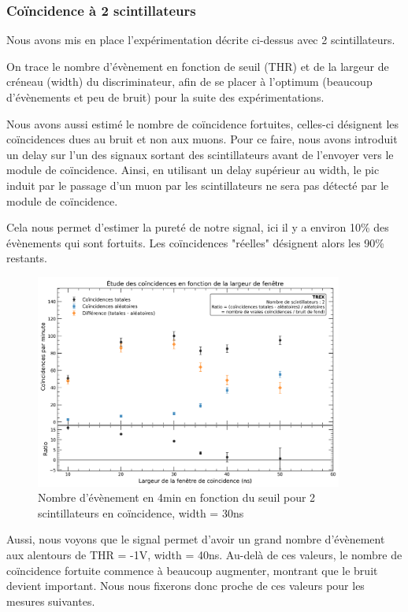 \documentclass[a4paper,12pt,twoside]{article}
\begin{document}
\subsubsection{Coïncidence à 2 scintillateurs}
Nous avons mis en place l’expérimentation décrite ci-dessus avec 2 scintillateurs.

On trace le nombre d’évènement en fonction de seuil (THR) et de la largeur de créneau (width) du discriminateur, afin de se placer à l’optimum (beaucoup d’évènements et peu de bruit) pour la suite des expérimentations.

Nous avons aussi estimé le nombre de coïncidence fortuites, celles-ci désignent les coïncidences dues au bruit et non aux muons. Pour ce faire, nous avons introduit un delay sur l’un des signaux sortant des scintillateurs avant de l’envoyer vers le module de coïncidence. Ainsi, en utilisant un delay supérieur au width, le pic induit par le passage d’un muon par les scintillateurs ne sera pas détecté par le module de coïncidence.

Cela nous permet d’estimer la pureté de notre signal, ici il y a environ 10\% des évènements qui sont fortuits. Les coïncidences "réelles" désignent alors les 90\% restants.

\begin{figure}[H]
    \centering
    \includegraphics[width=0.9\textwidth]{Images/Coincidences_2_Scintillateurs.png}
    \caption[Nombre d’évènement en 4min en fonction du seuil]{Nombre d’évènement en 4min en fonction du seuil pour 2 scintillateurs en coïncidence, width = 30ns}
\end{figure}

Aussi, nous voyons que le signal permet d’avoir un grand nombre d’évènement aux alentours de THR = -1V, width = 40ns. Au-delà de ces valeurs, le nombre de coïncidence fortuite commence à beaucoup augmenter, montrant que le bruit devient important. Nous nous fixerons donc proche de ces valeurs pour les mesures suivantes.
\end{document}
